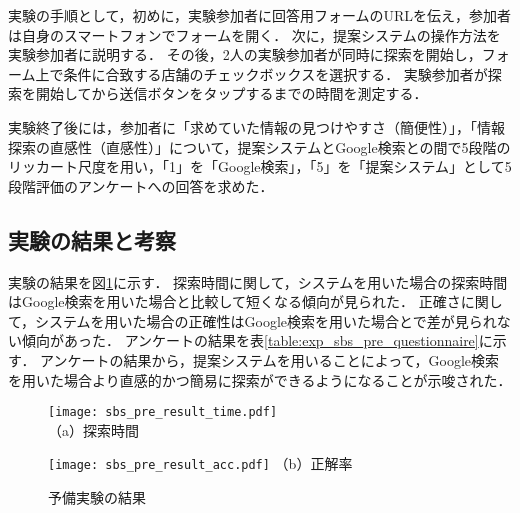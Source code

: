     実験の手順として，初めに，実験参加者に回答用フォームのURLを伝え，参加者は自身のスマートフォンでフォームを開く．
    次に，提案システムの操作方法を実験参加者に説明する．
    その後，2人の実験参加者が同時に探索を開始し，フォーム上で条件に合致する店舗のチェックボックスを選択する．
    実験参加者が探索を開始してから送信ボタンをタップするまでの時間を測定する．
    
    実験終了後には，参加者に「求めていた情報の見つけやすさ（簡便性）」，「情報探索の直感性（直感性）」について，提案システムとGoogle検索との間で5段階のリッカート尺度を用い，「1」を「Google検索」，「5」を「提案システム」として5段階評価のアンケートへの回答を求めた．

  \subsection{実験の結果と考察}
    実験の結果を図\ref{figure:exp_sbs_pre_result}に示す．
    探索時間に関して，システムを用いた場合の探索時間はGoogle検索を用いた場合と比較して短くなる傾向が見られた．
    正確さに関して，システムを用いた場合の正確性はGoogle検索を用いた場合とで差が見られない傾向があった．
    アンケートの結果を表\ref{table:exp_sbs_pre_questionnaire}に示す．
    アンケートの結果から，提案システムを用いることによって，Google検索を用いた場合より直感的かつ簡易に探索ができるようになることが示唆された．

    \begin{figure}[t]
      \begin{minipage}{0.49\hsize}
        \begin{center}
          \texttt{[image: sbs\_pre\_result\_time.pdf]}\\
          \small{（a）探索時間}
        \end{center}
      \end{minipage}
      \begin{minipage}{0.49\hsize}
        \begin{center}
          \texttt{[image: sbs\_pre\_result\_acc.pdf]}
          \small{（b）正解率}
        \end{center}
      \end{minipage}
      \caption{予備実験の結果}
      \label{figure:exp_sbs_pre_result}
    \end{figure}


